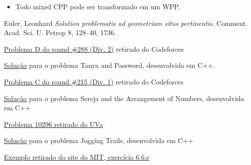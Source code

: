\documentclass[12pt, a4paper]{article}
\begin{document}
        \begin{itemize}
            \item Todo mixed CPP pode ser transformado em um WPP.
        \end{itemize}

    \fi

	\medskip

    \newpage
    \printbibliography

    \newpage
	\begin{thebibliography}{9}
	Euler, Leonhard
	\textit{Solution problematis ad geometriam situs pertinentis}. 
	Comment. Acad. Sci. U. Petrop 8, 128–40, 1736.


    \href{https://codeforces.com/contes<t/508/problem/D}{Problema D do round \#288 (Div. 2)}
     retirado do Codeforces


    \href{https://github.com/gafeol/competitive-programming/blob/master/ojs/cf/508/D.cpp}{Solução} para o problema Tanya and Password, desenvolvida em C++.


    \href{https://codeforces.com/problemset/problem/367/C}{Problema C do round \#215 (Div. 1)} retirado do Codeforces

     \href{https://github.com/gafeol/competitive-programming/blob/master/ojs/cf/367/C.cpp}{Solução}
     para o problema Sereja and the Arrangement of Numbers, desenvolvida em C++


    \href{https://onlinejudge.org/index.php?option=com_onlinejudge&Itemid=8&page=show_problem&problem=1237}{Problema 10296 retirado do UVa}

    \href{https://github.com/gafeol/competitive-programming/blob/master/ojs/UVa/1237.cpp}{Solução} para o problema Jogging Trails, desenvolvida em C++

%

    \href{http://web.mit.edu/urban_or_book/www/book/chapter6/problems6/6.6.html}{Exemplo retirado do site do MIT, exercício 6.6.c} 


\end{thebibliography}
\end{document}
